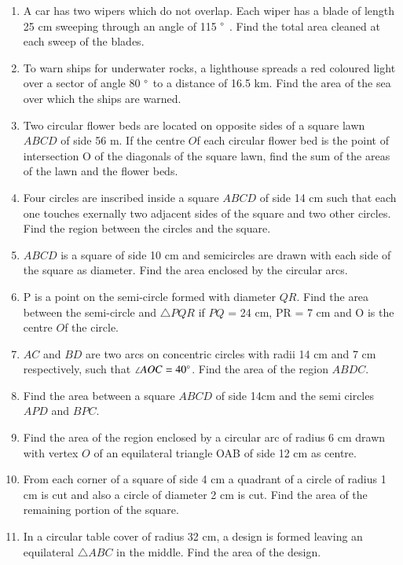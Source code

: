 \begin{enumerate}[label=\arabic*.,ref=\thesubsection.\theenumi]
\item A car has two wipers which do not overlap. Each wiper has a blade of length 25 cm sweeping through an angle of 115 $\degree$ . Find the total area cleaned at each sweep of the blades.
\item  To warn ships for underwater rocks, a lighthouse spreads a red coloured light over a sector of angle 80 $\degree$  to a distance of 16.5 km. Find the area of the sea over which the ships are warned.

%
\item Two circular flower beds are located on opposite sides of a square lawn $ABCD$ of side 56 m. If the centre $O$f each circular flower bed is the point of intersection O of the diagonals of the square lawn, find the sum of the areas of the lawn and the flower beds.
%
\item Four circles are inscribed  inside a square $ABCD$ of side 14 cm such that each one touches exernally two adjacent sides of the square and two  other circles.  Find the region between the circles and the square.
\item  $ABCD$ is a square of side 10 cm and semicircles are drawn with each side of the square as diameter. Find the area enclosed by the circular arcs.
%
\item P is a point on the semi-circle formed with diameter $QR$. Find the area between the semi-circle and $\triangle PQR$ if $PQ$ = 24 cm, PR = 7 cm and O is the centre $O$f the circle.
\item $AC$ and $BD$ are two arcs on concentric circles with radii 14 cm and 7 cm respectively, such that $\angle AOC = 40\degree$.  Find the area of the region $ABDC$.
%
\item Find the area between a square $ABCD$ of side 14cm and the semi circles $APD$ and $BPC$.
\item Find the area of the  region enclosed by  a circular arc of radius 6 cm drawn with vertex $O$ of an equilateral triangle OAB of side 12 cm as centre.
%
\item From each corner of a square of side 4 cm a quadrant of a circle of radius 1 cm is cut and also a circle of diameter 2 cm is cut. Find the area of the remaining portion of the square.\item In a circular table cover of radius 32 cm, a design is formed leaving an equilateral $\triangle ABC$ in the middle. Find the area of the design.

\end{enumerate}
